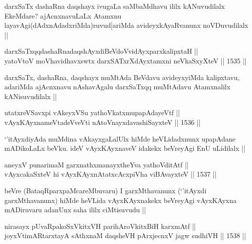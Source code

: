 \begin{artha}
darxSaTx dashaRna daqshayx ivugaLa saMbaMdhavu ililx kANuvudilalx EkeMdare? ajAcnxnavuLaLx Atamxnu layavAgi(dAdxnAdadxriMda)ruvud]ariMda avideyxkAyaRvanunx noVDuvudilalx ||
\end{artha}

\begin{shl}
darxSaTxqqdashaRnadaqshAyxdiBeVdoV\s vidAyxparxkalipxtaH || \\
yatoV\s toV moVhavidhavxswtx darxSATxrXdAyxtamxni neVkaSxyXteV ||  1535 ||  
\end{shl}

\begin{artha}
darxSaTx, dashaRna, daqshayx muMtAda BeVdavu avideyxyiMda kalipxtavu, adariMda ajAcnxnavu nAshavAgalu darxSaTxqq muMtAdavu Atamxnalilx kANisuvudilalx ||
\end{artha}

\begin{shl}
utatxreVSavxpi vAkeyxVSu yathoVkatxmupapAdayeVtf ||  \\
vAyxKAyxnameVtadeVveVti nAtoV\s nayxdavashiSayxteV ||  1536 ||  
\end{shl}

\begin{artha}
`\stext'itAyxdiyAda muMdina vAkayxgaLalUlx hiMde heVLidadxnunx upapAdane mADikoLaLx beVku. ideV vAyxKAyxnaveV idakekx beVreyAgi EnU uLidilalx ||
\end{artha}



\begin{shl}
aneyxV punarimaM garxnathxmanayxtheYva yathoVditAtf ||  \\
vAyxcakaSxteV hi vAyxKAyxnAtatxcAcxpiVha viBAvayxteV ||  1537 ||  
\end{shl}

\begin{artha}
beVre (BataqRparxpaMcareMbuvaru) I garxMthavanunx (`\stext'itAyxdi garxMthavanunx) hiMde heVLida vAyxKAyxnakekx beVreyAgi vAyxKAyxna mADiruvaru adanUnx saha ililx ciMtisuvudu ||
\end{artha}


\begin{shl}
nirasayx pUvaRpakoSxVkitxVH parihAroVkitxBiH karxmAtf || \\
joyxVtimARtarxtayA sAthxnaM daqsheVH pArxjecnxV jagw sudhiVH ||  1538 ||  
\end{shl}

